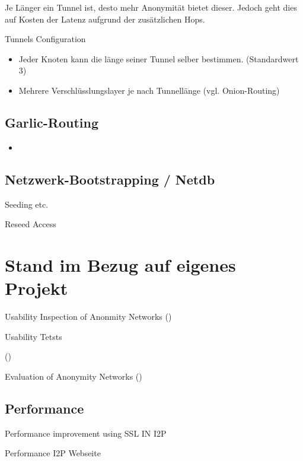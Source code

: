 Je Länger ein Tunnel ist, desto mehr Anonymität bietet dieser.
Jedoch geht dies auf Kosten der Latenz aufgrund der zusätzlichen Hops.

Tunnels Configuration
\cite{noauthor_i2p_nodate-3}

\begin{itemize}
    \item Jeder Knoten kann die länge seiner Tunnel selber bestimmen. (Standardwert 3)
    \item Mehrere Verschlüsslungslayer je nach Tunnellänge (vgl. Onion-Routing)
\end{itemize}

\subsection{Garlic-Routing}

\begin{itemize}
    \item
\end{itemize}

\subsection{Netzwerk-Bootstrapping / Netdb}

Seeding etc.

Reseed Access
\cite{noauthor_i2p_nodate-7}

\section{Stand im Bezug auf eigenes Projekt}

Usability Inspection of Anonmity Networks
(\cite{abou-tair_usability_2009})

Usability Tetsts

(\cite{schomburg_anonymity_2009})

Evaluation of Anonymity Networks
(\cite{timpanaro_evaluation_2015})

\subsection{Performance}


Performance improvement using SSL IN I2P
\cite{vashi_performance_2015}

Performance I2P Webseite
\cite{noauthor_performance_nodate}

